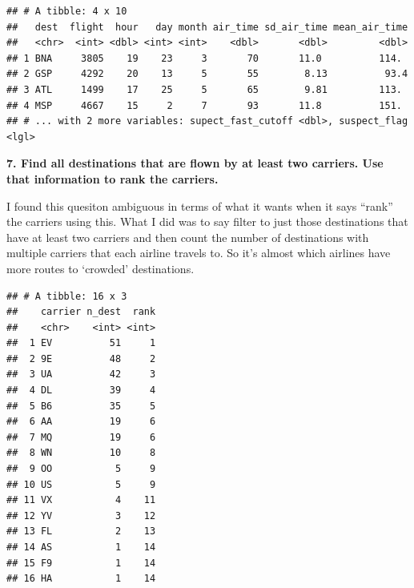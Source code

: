 \documentclass[]{book}
\newenvironment{Shaded}{\begin{snugshade}}{\end{snugshade}}
\newcommand{\DataTypeTok}[1]{\textcolor[rgb]{0.13,0.29,0.53}{#1}}
\newcommand{\DecValTok}[1]{\textcolor[rgb]{0.00,0.00,0.81}{#1}}
\newcommand{\KeywordTok}[1]{\textcolor[rgb]{0.13,0.29,0.53}{\textbf{#1}}}
\newcommand{\NormalTok}[1]{#1}
\newcommand{\OperatorTok}[1]{\textcolor[rgb]{0.81,0.36,0.00}{\textbf{#1}}}
\newcommand{\StringTok}[1]{\textcolor[rgb]{0.31,0.60,0.02}{#1}}
\theoremstyle{definition}
\theoremstyle{definition}
\theoremstyle{definition}
\theoremstyle{remark}
\begin{document}
\begin{verbatim}
## # A tibble: 4 x 10
##   dest  flight  hour   day month air_time sd_air_time mean_air_time
##   <chr>  <int> <dbl> <int> <int>    <dbl>       <dbl>         <dbl>
## 1 BNA     3805    19    23     3       70       11.0          114. 
## 2 GSP     4292    20    13     5       55        8.13          93.4
## 3 ATL     1499    17    25     5       65        9.81         113. 
## 4 MSP     4667    15     2     7       93       11.8          151. 
## # ... with 2 more variables: supect_fast_cutoff <dbl>, suspect_flag <lgl>
\end{verbatim}

\textbf{7. Find all destinations that are flown by at least two
carriers. Use that information to rank the carriers.}

I found this quesiton ambiguous in terms of what it wants when it says
``rank'' the carriers using this. What I did was to say filter to just
those destinations that have at least two carriers and then count the
number of destinations with multiple carriers that each airline travels
to. So it's almost which airlines have more routes to `crowded'
destinations.

\begin{Shaded}
\end{Shaded}

\begin{verbatim}
## # A tibble: 16 x 3
##    carrier n_dest  rank
##    <chr>    <int> <int>
##  1 EV          51     1
##  2 9E          48     2
##  3 UA          42     3
##  4 DL          39     4
##  5 B6          35     5
##  6 AA          19     6
##  7 MQ          19     6
##  8 WN          10     8
##  9 OO           5     9
## 10 US           5     9
## 11 VX           4    11
## 12 YV           3    12
## 13 FL           2    13
## 14 AS           1    14
## 15 F9           1    14
## 16 HA           1    14
\end{verbatim}
\end{document}

